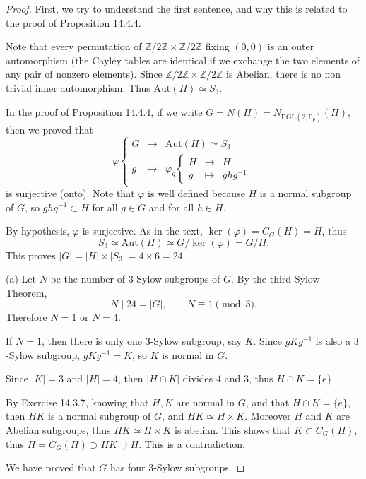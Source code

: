 \documentclass[11pt,a4paper]{article}
\newcommand{\Z}{\mathbb{Z}}
\newcommand{\F}{\mathbb{F}}
\begin{document}
{\begin{proof}
First, we try to understand the first sentence, and why this is related to the proof of Proposition 14.4.4.

Note that every permutation of $\Z/2\Z \times \Z/2\Z$ fixing $(0,0)$ is an outer automorphism (the Cayley tables are identical if we exchange the two elements of any pair of nonzero elements). Since $\Z/2\Z \times \Z/2\Z$ is Abelian, there is no non trivial inner automorphism. Thus $\mathrm{Aut}(H) \simeq S_3$.

In the proof of Proposition 14.4.4, if we write $G = N(H) = N_{\mathrm{PGL}(2,\F_p)}(H)$, then we proved that
$$
\varphi
\left\{
\begin{array}{ccc}
G &\to &\mathrm{Aut}(H) \simeq S_3\\
g & \mapsto & \varphi_g 
  \left\{
  \begin{array}{ccc}
  H &\to & H\\
  g & \mapsto &  ghg^{-1}
  \end{array}
  \right.
\end{array}
\right.
$$
is surjective (onto). Note that $\varphi$ is well defined because $H$ is a normal subgroup of $G$, so $ghg^{-1} \subset H$ for all $g \in G$ and for all $h \in H$.

By hypothesis, $\varphi$ is surjective. As in the text, $\ker(\varphi) = C_G(H) =  H$, thus
$$S_3 \simeq \mathrm{Aut}(H) \simeq G/\ker(\varphi) = G/H.$$
This proves $|G| = |H| \times |S_3| = 4 \times 6 = 24$.

\item[(a)] Let $N$ be the number of $3$-Sylow subgroups of $G$. By the third Sylow Theorem,
$$N \mid 24 = |G|, \qquad N \equiv 1 \pmod 3.$$
Therefore $N = 1$ or $N = 4$.

If $N = 1$, then there is only one $3$-Sylow subgroup, say $K$. Since  $gKg^{-1}$ is also a $3$-Sylow subgroup, $gKg^{-1} = K$, so $K$ is normal in $G$.

Since $|K| = 3$ and $|H| =4$, then $|H\cap K|$ divides $4$ and $3$, thus $H\cap K = \{e\}$.

By Exercise 14.3.7, knowing that $H,K$ are normal in $G$, and that $H\cap K = \{e\}$, then $HK$ is a normal subgroup of $G$, and $HK \simeq H \times K$. Moreover $H$ and $K$ are Abelian subgroups, thus $HK \simeq H \times K$ is abelian. This shows that $K \subset C_G(H)$, thus $H = C_G(H) \supset H K \supsetneq H$. This is a contradiction.

We have proved that $G$ has four $3$-Sylow subgroups.


\end{proof}}
\end{document}
